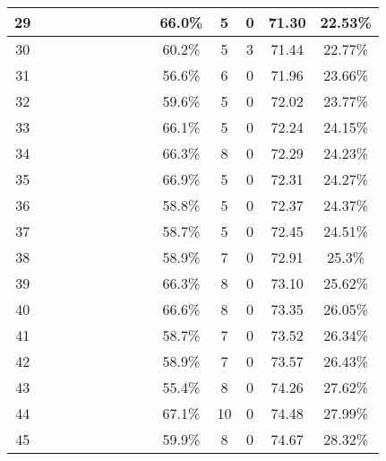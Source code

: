 \begin{longtable}{|c|c|c|c|c|c|c|c|c|c|c|c|c|c|}
29 &  \x    & \x    & \x    &       & \x\m  & \x    &       & \x    & 66.0\% &  5  & 0  & 71.30 & 22.53\% \\ \hline
30 &  \x    & \x    & \x    &       & \x    & \x\m  &       &       & 60.2\% &  5  & 3  & 71.44 & 22.77\% \\ \hline
31 &  \x    & \x    & \x    &       &       &       &       &       & 56.6\% &  6  & 0  & 71.96 & 23.66\% \\ \hline
32 &  \x    & \x    & \x    & \x    & \x    &       &       & \x    & 59.6\% &  5  & 0  & 72.02 & 23.77\% \\ \hline
33 &  \x    & \x    & \x    & \x    & \x\m  &       & \x    &       & 66.1\% &  5  & 0  & 72.24 & 24.15\% \\ \hline
34 &  \x    & \x    & \x    &       & \x\m  & \x    & \x\m  &       & 66.3\% &  8  & 0  & 72.29 & 24.23\% \\ \hline
35 &  \x    & \x    & \x    &       & \x\m  & \x\m  &       &       & 66.9\% &  5  & 0  & 72.31 & 24.27\% \\ \hline
36 &  \x    & \x    & \x    & \x    & \x    & \x    &       & \x\m  & 58.8\% &  5  & 0  & 72.37 & 24.37\% \\ \hline
37 &  \x    & \x    & \x    &       & \x    & \x    &       & \x    & 58.7\% &  5  & 0  & 72.45 & 24.51\% \\ \hline
38 &  \x    & \x    & \x    & \x    & \x    & \x\m  &       & \x\m  & 58.9\% &  7  & 0  & 72.91 & 25.3\% \\ \hline
39 &  \x    & \x    &       &       & \x\m  & \x\m  & \x\m  &       & 66.3\% &  8  & 0  & 73.10 & 25.62\% \\ \hline
40 &  \x    & \x    & \x    & \x    & \x\m  &       &       &       & 66.6\% &  8  & 0  & 73.35 & 26.05\% \\ \hline
41 &  \x    & \x    & \x    &       & \x    &       &       & \x    & 58.7\% &  7  & 0  & 73.52 & 26.34\% \\ \hline
42 &  \x    & \x    & \x    &       & \x    & \x\m  &       & \x\m  & 58.9\% &  7  & 0  & 73.57 & 26.43\% \\ \hline
43 &  \x    & \x    & \x    &       &       & \x    &       & \x\m  & 55.4\% &  8  & 0  & 74.26 & 27.62\% \\ \hline
44 &  \x    & \x    &       &       & \x\m  & \x\m  &       &       & 67.1\% &  10 & 0  & 74.48 & 27.99\% \\ \hline
45 &  \x    & \x    & \x    &       & \x    &       &       & \x\m  & 59.9\% &  8  & 0  & 74.67 & 28.32\% \\ \hline

\end{longtable}

